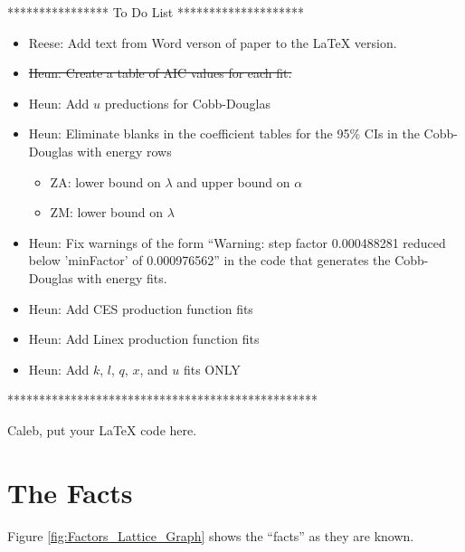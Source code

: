 \documentclass[preprint,authoryear,12pt]{elsarticle}\usepackage{graphicx, color}
\begin{document}
**************** To Do List ********************
\begin{itemize}
\item Reese: Add text from Word verson of paper to the LaTeX version.
\item \st{Heun: Create a table of AIC values for each fit.}
\item Heun: Add $u$ preductions for Cobb-Douglas
\item Heun: Eliminate blanks in the coefficient tables for the 95\% CIs in the Cobb-Douglas with energy rows 
      \begin{itemize}
      \item ZA: lower bound on $\lambda$ and upper bound on $\alpha$
      \item ZM: lower bound on $\lambda$
      \end{itemize}
\item Heun: Fix warnings of the form ``Warning:  step factor 0.000488281 reduced below ’minFactor’ of 0.000976562'' in the code that generates the Cobb-Douglas with energy fits.
\item Heun: Add CES production function fits
\item Heun: Add Linex production function fits
\item Heun: Add $k$, $l$, $q$, $x$, and $u$ fits ONLY
\end{itemize}
*************************************************

Caleb, put your LaTeX code here.










\section{The Facts}

Figure \ref{fig:Factors_Lattice_Graph} shows the ``facts'' as they are known.
\end{document}
